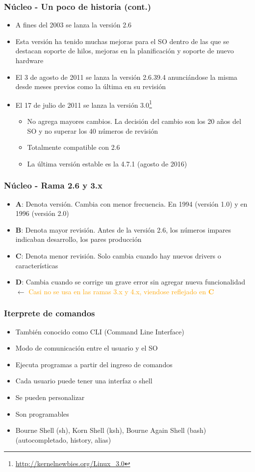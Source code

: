 \begin{frame}
	\frametitle{Núcleo - Un poco de historia (cont.)}
	\begin{itemize}
		\item A fines del 2003 se lanza la versión 2.6		
		\item Esta versión ha tenido muchas mejoras para el SO dentro de las que se destacan soporte de hilos, mejoras en la planificación y soporte de nuevo hardware
		\item El 3 de agosto de 2011 se lanza la versión 2.6.39.4
		anunciándose la misma desde meses previos como la última en su revisión
		\item El 17 de julio de 2011 se lanza la versión 3.0\footnote{\url{http://kernelnewbies.org/Linux_3.0}}
			\begin{itemize}
				\item No agrega mayores cambios. La decisión del cambio son los 20 años del SO y no superar los 40 números de revisión
				\item Totalmente compatible con 2.6
				\item La última versión estable es la 4.7.1 (agosto de 2016)
			\end{itemize}
	\end{itemize}
\end{frame}

\begin{frame}
	\frametitle{Núcleo - Rama 2.6 y 3.x}
	\begin{itemize}
		\item \textbf{A}: Denota versión. Cambia con menor frecuencia. En 1994 (versión 1.0) y en 1996 (versión 2.0)
		\item \textbf{B}: Denota mayor revisión. Antes de la versión 2.6, los números impares indicaban desarrollo, los pares producción
		\item \textbf{C}: Denota menor revisión. Solo cambia cuando hay nuevos drivers o características
		\item \textbf{D}: Cambia cuando se corrige un grave error sin agregar nueva funcionalidad $\leftarrow$ \textcolor{orange}{Casi no se usa en las ramas 3.x y 4.x, viendose reflejado en \textbf{C}}
	\end{itemize}
\end{frame}

\begin{frame}
	\frametitle{Iterprete de comandos}
	\begin{itemize}
		\item También conocido como CLI (Command Line Interface)
		\item Modo de comunicación entre el usuario y el SO
		\item Ejecuta programas a partir del ingreso de comandos
		\item Cada usuario puede tener una interfaz o shell
		\item Se pueden personalizar
		\item Son programables
		\item Bourne Shell (sh), Korn Shell (ksh), Bourne Again Shell (bash)(autocompletado, history, alias)
	\end{itemize}
\end{frame}


